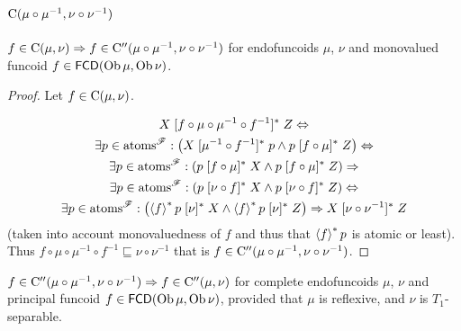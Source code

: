 \section{\texorpdfstring{$\mathrm{C} (\mu \circ \mu^{- 1} , \nu \circ \nu^{- 1})$}{C(mu o mu\textasciicircum-1, nu o nu\textasciicircum-1)}}

\begin{prop}
  $f \in \mathrm{C} (\mu, \nu) \Rightarrow f \in \mathrm{C}'' (\mu
  \circ \mu^{- 1} , \nu \circ \nu^{- 1})$ for endofuncoids $\mu$,
  $\nu$ and monovalued funcoid $f \in \mathsf{FCD} (\operatorname{Ob}
  \mu, \operatorname{Ob} \nu)$.
\end{prop}

\begin{proof}
  Let $f \in \mathrm{C} (\mu, \nu)$.

\begin{multline*}
  X \mathrel{[f \circ \mu \circ \mu^{- 1} \circ f^{- 1}]^{\ast}}
  Z \Leftrightarrow \\ \exists p \in \operatorname{atoms}^{\mathscr{F}} : \left( X
  \mathrel{[\mu^{- 1} \circ f^{- 1}]^{\ast}} p \wedge p \mathrel{[f
  \circ \mu]^{\ast}} Z \right) \Leftrightarrow \\ \exists p \in
  \operatorname{atoms}^{\mathscr{F}} : \left( p \mathrel{[f \circ \mu]^{\ast}} X
  \wedge p \mathrel{[f \circ \mu]^{\ast}} Z \right) \Rightarrow \\ \exists
  p \in \operatorname{atoms}^{\mathscr{F}} : \left( p \mathrel{[\nu \circ f]^{\ast}} X
  \wedge p \mathrel{[\nu \circ f]^{\ast}} Z \right) \Leftrightarrow \\ \exists p
  \in \operatorname{atoms}^{\mathscr{F}} : \left( \left\langle f\right\rangle ^{\ast} p
  \mathrel{[\nu]^{\ast}} X \wedge \left\langle f\right\rangle ^{\ast} p
  \mathrel{[\nu]^{\ast}} Z \right) \Rightarrow X \mathrel{[\nu \circ \nu^{-
  1}]^{\ast}} Z
\end{multline*}
(taken into account monovaluedness of $f$ and thus that
  $\left\langle f\right\rangle ^{\ast} p$ is atomic or least). Thus $f \circ \mu
  \circ \mu^{- 1} \circ f^{- 1} \sqsubseteq \nu \circ \nu^{- 1}$ that is
  $f \in \mathrm{C}'' (\mu \circ \mu^{- 1} , \nu \circ \nu^{-
  1})$.
\end{proof}

\begin{prop}
  $f \in \mathrm{C}'' (\mu \circ \mu^{- 1} , \nu \circ \nu^{- 1})
  \Rightarrow f \in \mathrm{C}'' (\mu, \nu)$ for complete endofuncoids
  $\mu$, $\nu$ and principal funcoid $f \in \mathsf{FCD}
  (\operatorname{Ob} \mu, \operatorname{Ob} \nu)$, provided that $\mu$ is
  reflexive, and $\nu$ is $T_1$-separable.
\end{prop}

